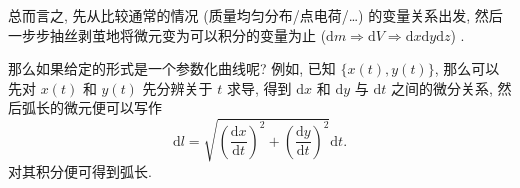 \begin{tcolorbox}[size=fbox, breakable, enhanced jigsaw, title={弧长 (arc length)}]
\begin{newquote}
总而言之, 先从比较通常的情况 (质量均匀分布/点电荷/\ldots)
的变量关系出发, 然后一步步抽丝剥茧地将微元变为可以积分的变量为止
(\(\mathrm{d}m\Rightarrow \mathrm{d}V\Rightarrow\mathrm{d}x\mathrm{d}y\mathrm{d}z\))
.
\end{newquote}

那么如果给定的形式是一个参数化曲线呢? 例如, 已知 \(\{x(t),y(t)\}\),
那么可以先对 \(x(t)\) 和 \(y(t)\) 先分辨关于 \(t\) 求导, 得到
\(\mathrm{d}x\) 和 \(\mathrm{d}y\) 与 \(\mathrm{d}t\) 之间的微分关系,
然后弧长的微元便可以写作 \[
\mathrm{d}l=\sqrt{\left(\frac{\mathrm{d}x}{\mathrm{d}t}\right)^2+\left(\frac{\mathrm{d}y}{\mathrm{d}t}\right)^2}\mathrm{d}t.
\] 对其积分便可得到弧长.
\end{tcolorbox}